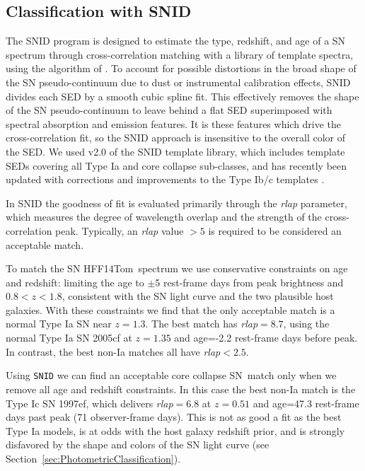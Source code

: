 \documentclass[iop]{emulateapj}
\def\tomas{HFF14Tom}
\newcommand{\CCSN}{core collapse SN}
\begin{document}
\subsection{Classification with SNID}
\label{sec:SNID}

The SNID program is designed to estimate the type, redshift, and age
of a SN spectrum through cross-correlation matching with a library of
template spectra, using the algorithm of \citet{Tonry:1979}.
To account for possible distortions in the broad shape of the SN
pseudo-continuum due to dust or instrumental calibration effects, SNID
divides each SED by a smooth cubic spline fit. This effectively
removes the shape of the SN pseudo-continuum to leave behind a flat
SED superimposed with spectral absorption and emission features.  It
is these features which drive the cross-correlation fit, so the SNID
approach is insensitive to the overall color of the SED.  We used v2.0
of the SNID template library, which includes template SEDs covering
all Type Ia and core collapse sub-classes, and has recently been
updated with corrections and improvements to the Type Ib/c
templates \citep{Liu:2014}.

In SNID the goodness of fit is evaluated primarily through the {\it
rlap} parameter, which measures the degree of wavelength overlap and
the strength of the cross-correlation peak.  Typically, an {\it rlap}
value $>5$ is required to be considered an acceptable match.  

To match the SN \tomas\ spectrum we use conservative constraints on
age and redshift: limiting the age to $\pm$5 rest-frame days from peak
brightness and $0.8<z<1.8$, consistent with the SN light curve and
the two plausible host galaxies.  With these constraints we find that the only
acceptable match is a normal Type Ia SN near $z=1.3$. The best match
has {\it rlap}$=8.7$, using the normal Type Ia SN 2005cf at $z=1.35$
and age=-2.2 rest-frame days before peak.  In contrast, 
the best non-Ia matches all have {\it rlap}$<2.5$.

Using {\tt SNID} we can find an acceptable \CCSN\ match only when we
remove all age and redshift constraints. In this case the best non-Ia
match is the Type Ic SN 1997ef, which delivers {\it rlap}$=6.8$ at
$z=0.51$ and age=47.3 rest-frame days past peak (71 observer-frame
days).  This is not as good a fit as the best Type Ia models, is at
odds with the host galaxy redshift prior, and is strongly disfavored
by the shape and colors of the SN light curve (see
Section~\ref{sec:PhotometricClassification}).
\end{document}

